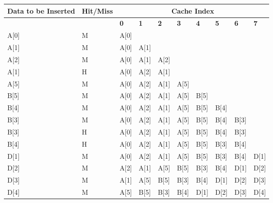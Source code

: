 \documentclass[addpoints]{exam}
\begin{document}
\begin{sloppypar}
\begin{questions}
\begin{parts}
        \begin{tabular}{|m{15mm} | m{17mm} | m{7.60mm} |m{7.60mm} |m{7.60mm} |m{7.60mm} |m{7.60mm} |m{7.60mm} |m{7.60mm} |m{7.60mm} |}
            \hline
            \raggedright\textbf{Data to \hspace*{3.5mm} be Inserted} &\raggedright \textbf{Hit/Miss} & \multicolumn{8}{|c|}{\textbf{Cache Index}} \\ \hline 
            & & \hspace*{3mm}\textbf{0} & \hspace*{3mm}\textbf{1} & \hspace*{3mm}\textbf{2} & \hspace*{3mm}\textbf{3} & \hspace*{3mm}\textbf{4} & \hspace*{3mm}\textbf{5} & \hspace*{3mm}\textbf{6} & \hspace*{3mm}\textbf{7} \\ \hline
            A[0] & M & A[0] & & & & & & & \\ \hline
            A[1] & M & A[0] & A[1] & & & & & & \\ \hline
            A[2] & M & A[0] & A[1] & A[2] & & & & & \\ \hline
            A[1] & H & A[0] & A[2] & \textcolor{my_green}{A[1]} & & & & & \\ \hline
            A[5] & M & A[0] & A[2] & A[1] & A[5] & & & & \\ \hline
            B[5] & M & A[0] & A[2] & A[1] & A[5] & B[5] & & & \\ \hline
            B[4] & M & A[0] & A[2] & A[1] & A[5] & B[5] & B[4] & & \\ \hline
            B[3] & M & A[0] & A[2] & A[1] & A[5] & B[5] & B[4] & B[3] & \\ \hline
            B[3] & H & A[0] & A[2] & A[1] & A[5] & B[5] & B[4] & \textcolor{my_green}{B[3]} & \\ \hline
            B[4] & H & A[0] & A[2] & A[1] & A[5] & B[5] & B[3] & \textcolor{my_green}{B[4]} & \\ \hline
            D[1] & M & A[0] & A[2] & A[1] & A[5] & B[5] & B[3] & B[4] & D[1] \\ \hline
            D[2] & M & A[2] & A[1] & A[5] & B[5] & B[3] & B[4] & D[1] & D[2] \\ \hline
            D[3] & M & A[1] & A[5] & B[5] & B[3] & B[4] & D[1] & D[2] & D[3] \\ \hline
            D[4] & M & A[5] & B[5] & B[3] & B[4] & D[1] & D[2] & D[3] & D[4] \\ \hline

\end{tabular}
\end{parts}
\end{questions}
\end{sloppypar}
\end{document}
